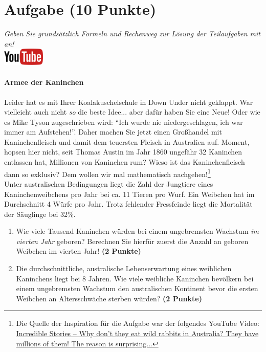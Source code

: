 \documentclass[a4paper, 9pt]{scrartcl}\usepackage[]{graphicx}\usepackage[]{xcolor}
\begin{document}
\clearpage

\section{Aufgabe \hfill (10 Punkte)}

\textit{Geben Sie grunds{\"a}tzlich Formeln und Rechenweg zur L{\"o}sung der
  Teilaufgaben mit an!} \\[1Ex]

\hfill\href{https://youtu.be/iErlRMwQ2RE}{\includegraphics[width =
  2cm]{img/youtube}} %
\hspace{2Ex}

\paragraph{Armee der Kaninchen}



Leider hat es mit Ihrer Koalakuschelschule in Down Under nicht geklappt. War vielleicht
auch nicht \textit{so} die beste Idee... aber daf{\"u}r haben Sie eine Neue!
Oder wie es Mike Tyson zugeschrieben wird: "`Ich wurde nie
niedergeschlagen, ich war immer am Aufstehen!"'. Daher machen Sie jetzt
einen Gro{\ss}handel mit Kaninchenfleisch und damit dem teuersten Fleisch in
Australien auf. Moment, hopsen hier nicht, seit Thomas Austin im Jahr
1860 ungef{\"a}hr 32 Kaninchen entlassen hat,
Millionen von Kaninchen rum? Wieso ist das Kaninchenfleisch dann so
exklusiv? Dem wollen wir mal mathematisch nachgehen!\footnote{Die Quelle
  der Inspiration f{\"u}r die Aufgabe war der folgendes YouTube Video:
  \href{https://youtu.be/38fuOr3tdgc?si=Li7NL_FoByML8JtT}{ Incredible
    Stories -- Why don't they eat wild rabbits in Australia? They have
    millions of them! The reason is surprising...}}
\\

Unter australischen Bedingungen liegt die Zahl der Jungtiere eines
Kaninchenweibchens pro Jahr bei ca. 11 Tieren pro Wurf. Ein
Weibchen hat im Durchschnitt 4 W{\"u}rfe pro Jahr. Trotz fehlender
Fressfeinde liegt die Mortalit{\"a}t der S{\"a}uglinge bei 32\%.

\begin{enumerate}
\item Wie viele Tausend Kaninchen w{\"u}rden bei einem ungebremsten
  Wachstum \textit{im vierten Jahr} geboren? Berechnen Sie hierf{\"u}r
  zuerst die Anzahl an geboren Weibchen im vierten Jahr! \textbf{(2 Punkte)}
\item Die durchschnittliche, australische Lebenserwartung eines weiblichen
  Kaninchens liegt bei 8 Jahren. Wie viele weibliche Kaninchen
  bev{\"o}lkern bei einem ungebremsten Wachstum den australischen Kontinent
  bevor die ersten Weibchen an Altersschw{\"a}che sterben w{\"u}rden? \textbf{(2
    Punkte)}
\end{enumerate}
\end{document}
